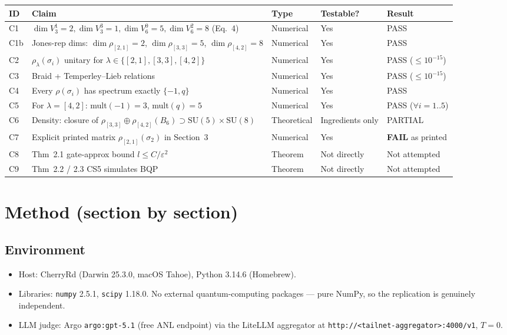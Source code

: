 \documentclass[11pt]{article}
\begin{document}
\begin{longtable}{p{1.2cm} p{9cm} p{1.5cm} p{1.8cm} p{2cm}}
\toprule
\textbf{ID} & \textbf{Claim} & \textbf{Type} & \textbf{Testable?} & \textbf{Result} \\
\midrule
C1  & $\dim V_3^1 = 2, \dim V_3^3 = 1, \dim V_6^0 = 5, \dim V_6^2 = 8$ (Eq.~4) & Numerical & Yes & PASS \\
C1b & Jones-rep dims: $\dim \rho_{[2,1]} = 2$, $\dim \rho_{[3,3]} = 5$, $\dim \rho_{[4,2]} = 8$ & Numerical & Yes & PASS \\
C2  & $\rho_\lambda(\sigma_i)$ unitary for $\lambda \in \{[2,1],[3,3],[4,2]\}$ & Numerical & Yes & PASS ($\le 10^{-15}$) \\
C3  & Braid + Temperley--Lieb relations & Numerical & Yes & PASS ($\le 10^{-15}$) \\
C4  & Every $\rho(\sigma_i)$ has spectrum exactly $\{-1, q\}$ & Numerical & Yes & PASS \\
C5  & For $\lambda = [4,2]$: mult$(-1) = 3$, mult$(q) = 5$ & Numerical & Yes & PASS ($\forall i = 1..5$) \\
C6  & Density: closure of $\rho_{[3,3]} \oplus \rho_{[4,2]}(B_6) \supset \mathrm{SU}(5) \times \mathrm{SU}(8)$ & Theoretical & Ingredients only & PARTIAL \\
C7  & Explicit printed matrix $\rho_{[2,1]}(\sigma_2)$ in Section~3 & Numerical & Yes & \textbf{FAIL} as printed \\
C8  & Thm~2.1 gate-approx bound $l \le C/\varepsilon^2$ & Theorem & Not directly & Not attempted \\
C9  & Thm~2.2 / 2.3 CS5 simulates BQP & Theorem & Not directly & Not attempted \\
\bottomrule
\end{longtable}

\section{Method (section by section)}

\subsection{Environment}
\begin{itemize}
  \item Host: CherryRd (Darwin 25.3.0, macOS Tahoe), Python 3.14.6 (Homebrew).
  \item Libraries: \texttt{numpy} 2.5.1, \texttt{scipy} 1.18.0. No external quantum-computing packages --- pure NumPy, so the replication is genuinely independent.
  \item LLM judge: Argo \texttt{argo:gpt-5.1} (free ANL endpoint) via the LiteLLM aggregator at \texttt{http://<tailnet-aggregator>:4000/v1}, $T = 0$.
\end{itemize}
\end{document}
